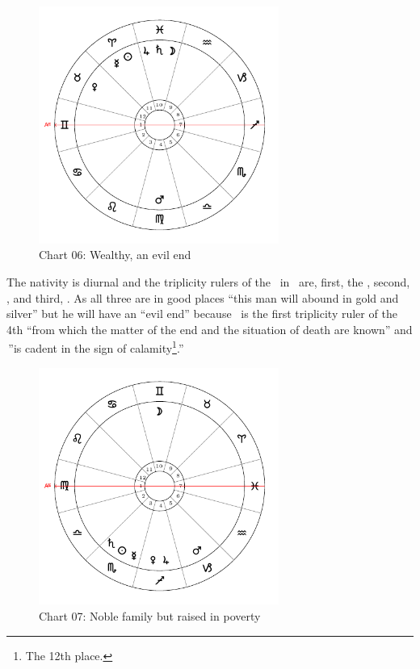 \newpage
\begin{figure}[H]
\centering
\includegraphics[width=0.7\textwidth]{charts/1_24_06}
\vspace{-1em}
\caption{Chart 06: Wealthy, an evil end}
\end{figure}

The nativity is diurnal and the triplicity rulers of the \Sun\, in \Aries\, are, first, the \Sun, second, \Jupiter, and third, \Saturn. As all three are in good places ``this man will abound in gold and silver'' but he will have an ``evil end'' because \Venus\, is the first triplicity ruler of the 4th ``from which the matter of the end and the situation of death are known'' and \Venus\,''is cadent in the sign of calamity\footnote{The 12th place.}.''

\newpage
\begin{figure}[H]
\centering
\includegraphics[width=0.7\textwidth]{charts/1_24_07}
\vspace{-1em}
\caption{Chart 07: Noble family but raised in poverty}
\end{figure}


